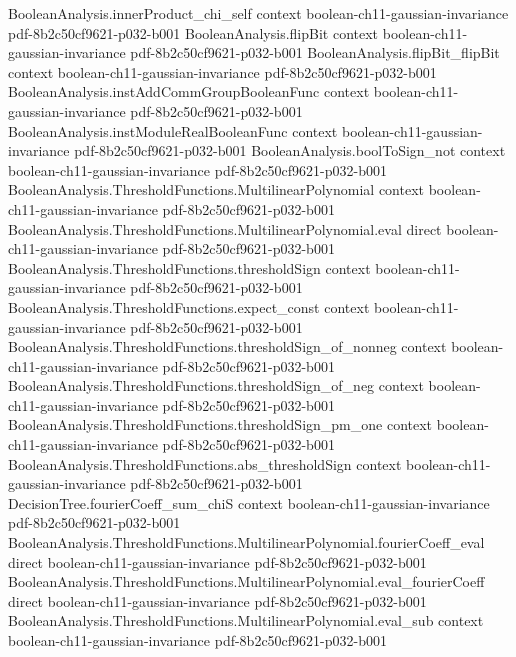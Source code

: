 \begin{theorem}
  {BooleanAnalysis.innerProduct_chi_self}
  {context}
  {boolean-ch11-gaussian-invariance}
  {pdf-8b2c50cf9621-p032-b001}
\proofstep
  {BooleanAnalysis.flipBit}
  {context}
  {boolean-ch11-gaussian-invariance}
  {pdf-8b2c50cf9621-p032-b001}
\proofstep
  {BooleanAnalysis.flipBit_flipBit}
  {context}
  {boolean-ch11-gaussian-invariance}
  {pdf-8b2c50cf9621-p032-b001}
\proofstep
  {BooleanAnalysis.instAddCommGroupBooleanFunc}
  {context}
  {boolean-ch11-gaussian-invariance}
  {pdf-8b2c50cf9621-p032-b001}
\proofstep
  {BooleanAnalysis.instModuleRealBooleanFunc}
  {context}
  {boolean-ch11-gaussian-invariance}
  {pdf-8b2c50cf9621-p032-b001}
\proofstep
  {BooleanAnalysis.boolToSign_not}
  {context}
  {boolean-ch11-gaussian-invariance}
  {pdf-8b2c50cf9621-p032-b001}
\proofstep
  {BooleanAnalysis.ThresholdFunctions.MultilinearPolynomial}
  {context}
  {boolean-ch11-gaussian-invariance}
  {pdf-8b2c50cf9621-p032-b001}
\proofstep
  {BooleanAnalysis.ThresholdFunctions.MultilinearPolynomial.eval}
  {direct}
  {boolean-ch11-gaussian-invariance}
  {pdf-8b2c50cf9621-p032-b001}
\proofstep
  {BooleanAnalysis.ThresholdFunctions.thresholdSign}
  {context}
  {boolean-ch11-gaussian-invariance}
  {pdf-8b2c50cf9621-p032-b001}
\proofstep
  {BooleanAnalysis.ThresholdFunctions.expect_const}
  {context}
  {boolean-ch11-gaussian-invariance}
  {pdf-8b2c50cf9621-p032-b001}
\proofstep
  {BooleanAnalysis.ThresholdFunctions.thresholdSign_of_nonneg}
  {context}
  {boolean-ch11-gaussian-invariance}
  {pdf-8b2c50cf9621-p032-b001}
\proofstep
  {BooleanAnalysis.ThresholdFunctions.thresholdSign_of_neg}
  {context}
  {boolean-ch11-gaussian-invariance}
  {pdf-8b2c50cf9621-p032-b001}
\proofstep
  {BooleanAnalysis.ThresholdFunctions.thresholdSign_pm_one}
  {context}
  {boolean-ch11-gaussian-invariance}
  {pdf-8b2c50cf9621-p032-b001}
\proofstep
  {BooleanAnalysis.ThresholdFunctions.abs_thresholdSign}
  {context}
  {boolean-ch11-gaussian-invariance}
  {pdf-8b2c50cf9621-p032-b001}
\proofstep
  {DecisionTree.fourierCoeff_sum_chiS}
  {context}
  {boolean-ch11-gaussian-invariance}
  {pdf-8b2c50cf9621-p032-b001}
\proofstep
  {BooleanAnalysis.ThresholdFunctions.MultilinearPolynomial.fourierCoeff_eval}
  {direct}
  {boolean-ch11-gaussian-invariance}
  {pdf-8b2c50cf9621-p032-b001}
\proofstep
  {BooleanAnalysis.ThresholdFunctions.MultilinearPolynomial.eval_fourierCoeff}
  {direct}
  {boolean-ch11-gaussian-invariance}
  {pdf-8b2c50cf9621-p032-b001}
\proofstep
  {BooleanAnalysis.ThresholdFunctions.MultilinearPolynomial.eval_sub}
  {context}
  {boolean-ch11-gaussian-invariance}
  {pdf-8b2c50cf9621-p032-b001}
\proofstep

\end{theorem}
